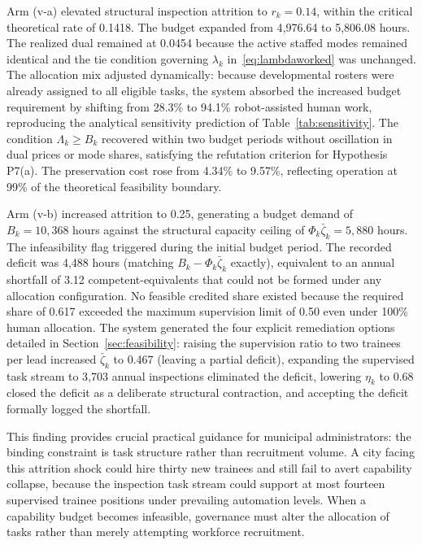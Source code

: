 	Arm (v-a) elevated structural inspection attrition to $r_k = 0.14$, within the critical theoretical rate of 0.1418. The budget expanded from 4{,}976.64 to 5{,}806.08 hours. The realized dual remained at 0.0454 because the active staffed modes remained identical and the tie condition governing $\lambda_k$ in~\eqref{eq:lambdaworked} was unchanged. The allocation mix adjusted dynamically: because developmental rosters were already assigned to all eligible tasks, the system absorbed the increased budget requirement by shifting from 28.3\% to 94.1\% robot-assisted human work, reproducing the analytical sensitivity prediction of Table~\ref{tab:sensitivity}. The condition $\Lambda_k \geq B_k$ recovered within two budget periods without oscillation in dual prices or mode shares, satisfying the refutation criterion for Hypothesis P7(a). The preservation cost rose from 4.34\% to 9.57\%, reflecting operation at 99\% of the theoretical feasibility boundary.
	
	Arm (v-b) increased attrition to 0.25, generating a budget demand of $B_k = 10{,}368$ hours against the structural capacity ceiling of $\Phi_k\bar\zeta_k = 5{,}880$ hours. The infeasibility flag triggered during the initial budget period. The recorded deficit was 4{,}488 hours (matching $B_k - \Phi_k\bar\zeta_k$ exactly), equivalent to an annual shortfall of 3.12 competent-equivalents that could not be formed under any allocation configuration. No feasible credited share existed because the required share of 0.617 exceeded the maximum supervision limit of 0.50 even under 100\% human allocation. The system generated the four explicit remediation options detailed in Section~\ref{sec:feasibility}: raising the supervision ratio to two trainees per lead increased $\bar\zeta_k$ to 0.467 (leaving a partial deficit), expanding the supervised task stream to 3{,}703 annual inspections eliminated the deficit, lowering $\eta_k$ to 0.68 closed the deficit as a deliberate structural contraction, and accepting the deficit formally logged the shortfall.
	
	This finding provides crucial practical guidance for municipal administrators: the binding constraint is task structure rather than recruitment volume. A city facing this attrition shock could hire thirty new trainees and still fail to avert capability collapse, because the inspection task stream could support at most fourteen supervised trainee positions under prevailing automation levels. When a capability budget becomes infeasible, governance must alter the allocation of tasks rather than merely attempting workforce recruitment.
	
